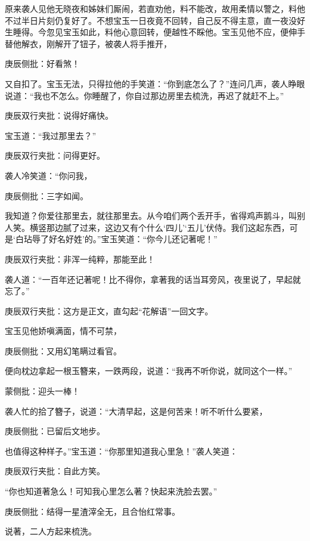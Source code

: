 \begin{parag}
    原来袭人见他无晓夜和姊妹们厮闹，若直劝他，料不能改，故用柔情以警之，料他不过半日片刻仍复好了。不想宝玉一日夜竟不回转，自己反不得主意，直一夜没好生睡得。今忽见宝玉如此，料他心意回转，便越性不睬他。宝玉见他不应，便伸手替他解衣，刚解开了钮子，被袭人将手推开，\begin{note}庚辰侧批：好看煞！\end{note}又自扣了。宝玉无法，只得拉他的手笑道：“你到底怎么了？”连问几声，袭人睁眼说道：“我也不怎么。你睡醒了，你自过那边房里去梳洗，再迟了就赶不上。”\begin{note}庚辰双行夹批：说得好痛快。\end{note}宝玉道：“我过那里去？”\begin{note}庚辰双行夹批：问得更好。\end{note}袭人冷笑道：“你问我，\begin{note}庚辰侧批：三字如闻。\end{note}我知道？你爱往那里去，就往那里去。从今咱们两个丢开手，省得鸡声鹅斗，叫别人笑。横竖那边腻了过来，这边又有个什么‘四儿’‘五儿’伏侍。我们这起东西，可是‘白玷辱了好名好姓’的。”宝玉笑道：“你今儿还记著呢！”\begin{note}庚辰双行夹批：非浑一纯粹，那能至此！\end{note}袭人道：“一百年还记著呢！比不得你，拿著我的话当耳旁风，夜里说了，早起就忘了。”\begin{note}庚辰双行夹批：这方是正文，直勾起“花解语”一回文字。\end{note}宝玉见他娇嗔满面，情不可禁，\begin{note}庚辰侧批：又用幻笔瞒过看官。\end{note}便向枕边拿起一根玉簪来，一跌两段，说道：“我再不听你说，就同这个一样。”\begin{note}蒙侧批：迎头一棒！\end{note}袭人忙的拾了簪子，说道：“大清早起，这是何苦来！听不听什么要紧，\begin{note}庚辰侧批：已留后文地步。\end{note}也值得这种样子。”宝玉道：“你那里知道我心里急！”袭人笑道：\begin{note}庚辰双行夹批：自此方笑。\end{note}“你也知道著急么！可知我心里怎么著？快起来洗脸去罢。”\begin{note}庚辰侧批：结得一星渣滓全无，且合怡红常事。\end{note}说著，二人方起来梳洗。
\end{parag}


